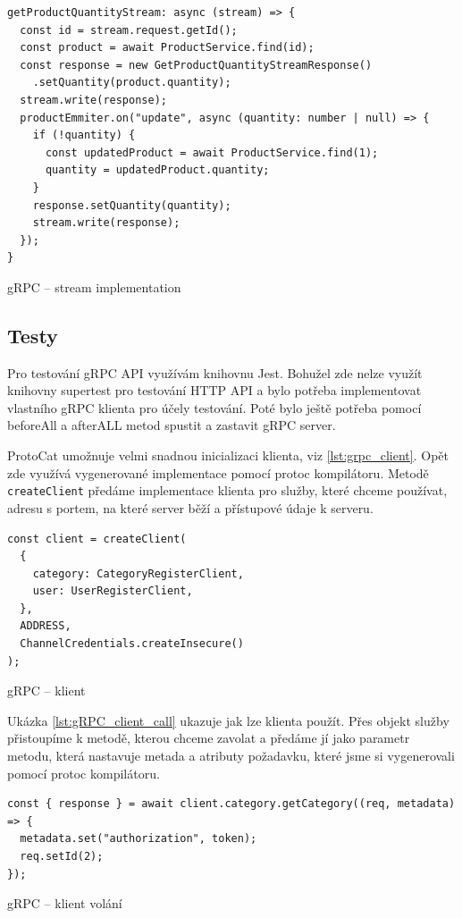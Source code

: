 \documentclass[thesis=M,czech]{FITthesis}[2019/12/23]
\begin{document}
\begin{listing}[H]
\begin{verbatim}
getProductQuantityStream: async (stream) => {
  const id = stream.request.getId();
  const product = await ProductService.find(id);
  const response = new GetProductQuantityStreamResponse()
    .setQuantity(product.quantity);
  stream.write(response);
  productEmmiter.on("update", async (quantity: number | null) => {
    if (!quantity) {
      const updatedProduct = await ProductService.find(1);
      quantity = updatedProduct.quantity;
    }
    response.setQuantity(quantity);
    stream.write(response);
  });
}
\end{verbatim}
\caption{gRPC -- stream implementation}
\label{lst:grpc_stream implementation}
\end{listing}

\subsection{Testy}
Pro testování gRPC API využívám knihovnu Jest. Bohužel zde nelze využít knihovny supertest pro testování HTTP API a bylo potřeba implementovat vlastního gRPC klienta pro účely testování. Poté bylo ještě potřeba pomocí beforeAll a afterALL metod spustit a zastavit gRPC server.

ProtoCat umožnuje velmi snadnou inicializaci klienta, viz \ref{lst:grpc_client}. Opět zde využívá vygenerované implementace pomocí protoc kompilátoru. Metodě \texttt{createClient} předáme implementace klienta pro služby, které chceme používat, adresu s portem, na které server běží a přístupové údaje k serveru.

\begin{listing}[H]
\begin{verbatim}
const client = createClient(
  {
    category: CategoryRegisterClient,
    user: UserRegisterClient,
  },
  ADDRESS,
  ChannelCredentials.createInsecure()
);
\end{verbatim}
\caption{gRPC -- klient}
\label{lst:grpc_client}
\end{listing}

Ukázka \ref{lst:gRPC_client_call} ukazuje jak lze klienta použít. Přes objekt služby přistoupíme k metodě, kterou chceme zavolat a předáme jí jako parametr metodu, která nastavuje metada a atributy požadavku, které jsme si vygenerovali pomocí protoc kompilátoru.

\begin{listing}[H]
\begin{verbatim}
const { response } = await client.category.getCategory((req, metadata) => {
  metadata.set("authorization", token);
  req.setId(2);
});
\end{verbatim}
\caption{gRPC -- klient volání}
\label{lst:gRPC_client_call}
\end{listing}
\end{document}
